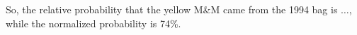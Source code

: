 \documentclass[12pt]{article}
\newcommand{\tab}{\hspace*{1.5em}}
\begin{document}
So, the relative probability that the yellow M\&M came from the 1994 bag is $\dots$, while the normalized probability is 74\%.

\subsection*{}




\end{document}
